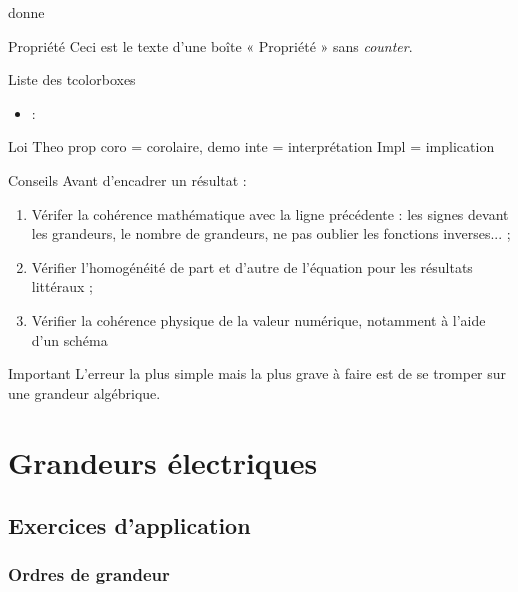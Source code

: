 \documentclass[10pt,a5paper,notitlepage]{book}
\begin{document}
donne

\begin{NCprop}{Propriété}
    Ceci est le texte d'une boîte « Propriété » sans \textit{counter}.
\end{NCprop}

\begin{NCdefi}{Liste des tcolorboxes}
    \begin{itemize}
        \item {} : 
    \end{itemize}
\end{NCdefi}

Loi
Theo
prop
coro = corolaire,
demo
inte = interprétation
Impl = implication

\begin{NCcoro}{Conseils}
    Avant d'encadrer un résultat :
    \begin{enumerate}
        \item Vérifer la cohérence mathématique avec la ligne précédente : les
            signes devant les grandeurs, le nombre de grandeurs, ne pas oublier
            les fonctions inverses... ;
        \item Vérifier l'homogénéité de part et d'autre de l'équation pour les
            résultats littéraux ;
        \item Vérifier la cohérence physique de la valeur numérique, notamment à
            l'aide d'un schéma
    \end{enumerate}
\end{NCcoro}

\begin{NCimpo}{Important}
    L'erreur la plus simple mais la plus grave à faire est de se tromper sur une
    grandeur algébrique.
    \begin{center}
    \end{center}
\end{NCimpo}

\chapter{Grandeurs électriques}\label{ch:O1}
\vspace*{-24pt}
\section{Exercices d'application}
\subsection{Ordres de grandeur}
\end{document}
